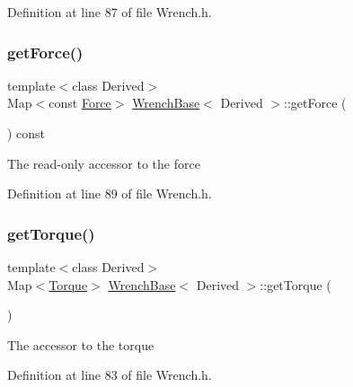 Definition at line 87 of file Wrench.\+h.

\hypertarget{class_wrench_base_ad7a67b2a101a6ce7fdd5d526b403c366}{}\label{class_wrench_base_ad7a67b2a101a6ce7fdd5d526b403c366} 
\subsubsection{\texorpdfstring{get\+Force()}{getForce()}\hspace{0.1cm}{\footnotesize\ttfamily [2/2]}}
{\footnotesize\ttfamily template$<$class Derived$>$ \\
Map$<$const \hyperlink{class_wrench_base_aa589699bbf0d18c023a0a2fe6482b4a7}{Force}$>$ \hyperlink{class_wrench_base}{Wrench\+Base}$<$ Derived $>$\+::get\+Force (\begin{DoxyParamCaption}{ }\end{DoxyParamCaption}) const\hspace{0.3cm}{\ttfamily [inline]}}

The read-\/only accessor to the force 

Definition at line 89 of file Wrench.\+h.

\hypertarget{class_wrench_base_a98a8a8c4e950d4876d4d0ca572e85c6a}{}\label{class_wrench_base_a98a8a8c4e950d4876d4d0ca572e85c6a} 
\subsubsection{\texorpdfstring{get\+Torque()}{getTorque()}\hspace{0.1cm}{\footnotesize\ttfamily [1/2]}}
{\footnotesize\ttfamily template$<$class Derived$>$ \\
Map$<$\hyperlink{class_wrench_base_a8fa1b5e32e8418247118cc24be70d68d}{Torque}$>$ \hyperlink{class_wrench_base}{Wrench\+Base}$<$ Derived $>$\+::get\+Torque (\begin{DoxyParamCaption}{ }\end{DoxyParamCaption})\hspace{0.3cm}{\ttfamily [inline]}}

The accessor to the torque 

Definition at line 83 of file Wrench.\+h.

\hypertarget{class_wrench_base_aeaa544c7a85fdb6e38af179b9dad68ab}{}\label{class_wrench_base_aeaa544c7a85fdb6e38af179b9dad68ab} 
